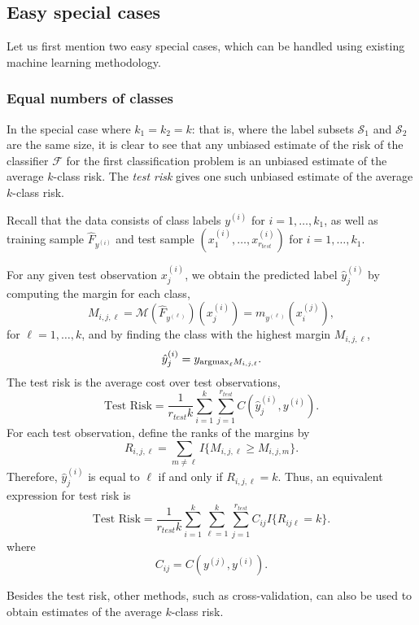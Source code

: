 \documentclass[12pt]{article}
\begin{document}
\subsection{Easy special cases}

Let us first mention two easy special cases, which can be handled
using existing machine learning methodology.

\subsubsection{Equal numbers of classes}

In the special case where $k_1 = k_2 = k$: that is, where the label
subsets $\mathcal{S}_1$ and $\mathcal{S}_2$ are the same size, it is
clear to see that any unbiased estimate of the risk of the classifier
$\mathcal{F}$ for the first classification problem is an unbiased
estimate of the average $k$-class risk.  The \emph{test risk}
gives one such unbiased estimate of the average $k$-class risk.

Recall that the data consists of class labels $y^{(i)}$ for $i =
1,\hdots, k_1$, as well as training sample $\hat{F}_{y^{(i)}}$ and
test sample $(x_1^{(i)},\hdots, x_{r_{test}}^{(i)})$ for $i =
1,\hdots, k_1$.

For any given test observation $x_j^{(i)}$, we obtain the predicted
label $\hat{y}_j^{(i)}$ by computing the margin for each class,
\[
M_{i,j,\ell} = \mathcal{M}(\hat{F}_{y^{(\ell)}})(x_j^{(i)}) =  m_{y^{(\ell)}}(x_i^{(j)}),
\]
for $\ell = 1,\hdots, k$,
and by finding the class with the highest margin $M_{i, j, \ell}$,
\[
\hat{y}_j^{(i)} = y_{\text{argmax}_\ell M_{i, j, \ell}}.
\]
The test risk is the average cost over test observations,
\begin{equation}
\text{Test Risk} = \frac{1}{r_{test}k} \sum_{i=1}^k \sum_{j=1}^{r_{test}} C(\hat{y}_j^{(i)}, y^{(i)}).
\end{equation}
For each test observation, define the ranks of the margins by
\[
R_{i,j,\ell} = \sum_{m \neq \ell} I\{M_{i,j,\ell} \geq M_{i, j, m}\}.
\]
Therefore, $\hat{y}_j^{(i)}$ is equal to $\ell$ if and only if $R_{i,j,\ell} = k$.
Thus, an equivalent expression for test risk is
\begin{equation}\label{eq:test_risk}
\text{Test Risk} = \frac{1}{r_{test}k} \sum_{i=1}^k \sum_{\ell=1}^k \sum_{j=1}^{r_{test}} C_{ij} I\{R_{ij\ell} = k\}.
\end{equation}
where
\[
C_{ij} = C(y^{(j)}, y^{(i)}).
\]

Besides the test risk, other methods, such as cross-validation, can
also be used to obtain estimates of the average $k$-class risk.
\end{document}
